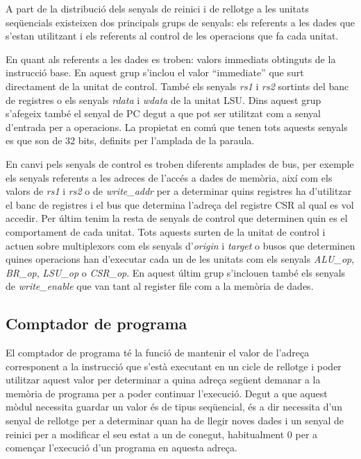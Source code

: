 \documentclass[10pt,a4paper,twocolumn,twoside]{article}
\begin{document}
        A part de la distribució dels senyals de reinici i de rellotge a les unitats seqüencials existeixen dos principals grups de senyals: els referents a les dades que s'estan utilitzant i els referents al control de les operacions que fa cada unitat.
        
        En quant als referents a les dades es troben: valors immediats obtinguts de la instrucció base. En aquest grup s'inclou el valor ``immediate'' que surt directament de la unitat de control. %
        També els senyals \textit{rs1} i \textit{rs2} sortints del banc de registres o els senyals \textit{rdata} i \textit{wdata} de la unitat LSU. Dins aquest grup s'afegeix també el senyal de PC degut a que pot ser utilitzat com a senyal d'entrada per a operacions. La propietat en comú que tenen tots aquests senyals es que son de 32 bits, definits per l'amplada de la paraula.
        
        En canvi pels senyals de control es troben diferents amplades de bus, per exemple els senyals referents a les adreces de l'accés a dades de memòria, així com els valors de \textit{rs1} i \textit{rs2} o de \textit{write\_addr} per a determinar quins registres ha d'utilitzar el banc de registres i el bus que determina l'adreça del registre CSR al qual es vol accedir. Per últim tenim la resta de senyals de control que determinen quin es el comportament de cada unitat. Tots aquests surten de la unitat de control i actuen sobre multiplexors com els senyals d'\textit{origin} i \textit{target} o busos que determinen quines operacions han d'executar cada un de les unitats com els senyals \textit{ALU\_op}, \textit{BR\_op}, \textit{LSU\_op} o \textit{CSR\_op}. En aquest últim grup s'inclouen també els senyals de \textit{write\_enable} que van tant al register file com a la memòria de dades.
        
        
    \subsection{Comptador de programa}
    
    El comptador de programa té la funció de mantenir el valor de l'adreça corresponent a la instrucció que s'està executant en un cicle de rellotge i poder utilitzar aquest valor per determinar a quina adreça següent demanar a la memòria de programa per a poder continuar l'execució.
    Degut a que aquest mòdul necessita guardar un valor és de tipus seqüencial, és a dir necessita d'un senyal de rellotge per a determinar quan ha de llegir noves dades i un senyal de reinici  per a modificar el seu estat a un de conegut, habitualment 0 per a començar l'execució d'un programa en aquesta adreça. 
    
\end{document}
